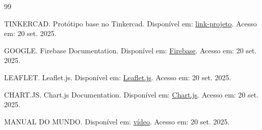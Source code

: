 \documentclass[
    12pt,
    openright,
    oneside,
    a4paper,
    brazil
]{abntex2}
\begin{document}
\begin{thebibliography}{99}

 TINKERCAD. Protótipo base no Tinkercad. Disponível em: \href{https://www.tinkercad.com/things/3Hd7QsF61PI-regador-inteligente}{link-projeto}. Acesso em: 20 set. 2025.

 GOOGLE. Firebase Documentation. Disponível em: \href{https://firebase.google.com/docs}{Firebase}. Acesso em: 20 set. 2025.

 LEAFLET. Leaflet.js. Disponível em: \href{https://leafletjs.com/}{Leaflet.js}. Acesso em: 20 set. 2025.

 CHART.JS. Chart.js Documentation. Disponível em: \href{https://www.chartjs.org/}{Chart.js}. Acesso em: 20 set. 2025.

 MANUAL DO MUNDO. Disponível em: \href{https://youtu.be/_xRyePvaMqU?si=kJ5MQaMxgp4OxUS8}{vídeo}. Acesso em: 20 set. 2025.

\end{thebibliography}
\end{document}
